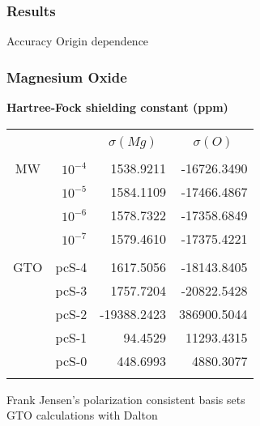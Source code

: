 \begin{frame}
    \frametitle{Results}
    Accuracy
    Origin dependence
\end{frame}

\begin{frame}
\frametitle{Magnesium Oxide}
   
\centering
\textbf{Hartree-Fock shielding constant (ppm)}
\begin{table}
\begin{tabular}{crrr}
\hline
\hline
    &              &            &             \\
    &              &
\multicolumn{1}{c}{$\sigma(Mg)$}              &
\multicolumn{1}{c}{$\sigma(O)$}	              \\
    &              &            &             \\
MW  & $10^{-4}$    &  1538.9211 & -16726.3490 \\
    & $10^{-5}$    &  1584.1109 & -17466.4867 \\
    & $10^{-6}$    &  1578.7322 & -17358.6849 \\
    & $10^{-7}$    &  1579.4610 & -17375.4221 \\
    &              &            &             \\
GTO & pcS-4        &  1617.5056 & -18143.8405 \\
    & pcS-3        &  1757.7204 & -20822.5428 \\
    & pcS-2        &-19388.2423 & 386900.5044 \\
    & pcS-1        &    94.4529 &  11293.4315 \\
    & pcS-0        &   448.6993 &   4880.3077 \\
    &              &            &             \\
\hline
\hline
\end{tabular}
\end{table}

Frank Jensen's polarization consistent basis sets\\
GTO calculations with Dalton

\end{frame}
